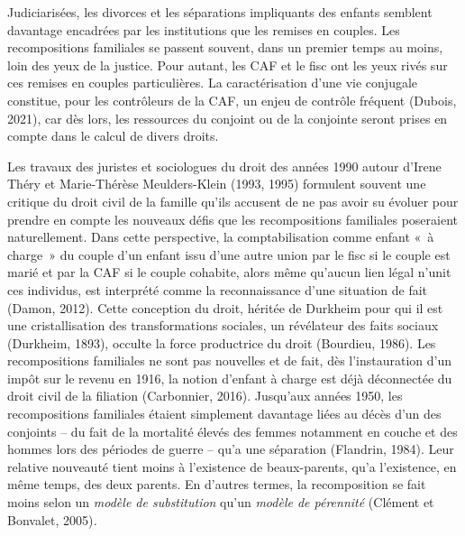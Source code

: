 \documentclass[
  12pt,
]{book}
\begin{document}
Judiciarisées, les divorces et les séparations impliquants des enfants
semblent davantage encadrées par les institutions que les remises en
couples. Les recompositions familiales se passent souvent, dans un
premier temps au moins, loin des yeux de la justice. Pour autant, les
CAF et le fisc ont les yeux rivés sur ces remises en couples
particulières. La caractérisation d'une vie conjugale constitue, pour
les contrôleurs de la CAF, un enjeu de contrôle fréquent (Dubois, 2021),
car dès lors, les ressources du conjoint ou de la conjointe seront
prises en compte dans le calcul de divers droits.

Les travaux des juristes et sociologues du droit des années 1990 autour
d'Irene Théry et Marie-Thérèse Meulders-Klein (1993, 1995) formulent
souvent une critique du droit civil de la famille qu'ils accusent de ne
pas avoir su évoluer pour prendre en compte les nouveaux défis que les
recompositions familiales poseraient naturellement. Dans cette
perspective, la comptabilisation comme enfant «~à charge~» du couple
d'un enfant issu d'une autre union par le fisc si le couple est marié et
par la CAF si le couple cohabite, alors même qu'aucun lien légal n'unit
ces individus, est interprété comme la reconnaissance d'une situation de
fait (Damon, 2012). Cette conception du droit, héritée de Durkheim pour
qui il est une cristallisation des transformations sociales, un
révélateur des faits sociaux (Durkheim, 1893), occulte la force
productrice du droit (Bourdieu, 1986). Les recompositions familiales ne
sont pas nouvelles et de fait, dès l'instauration d'un impôt sur le
revenu en 1916, la notion d'enfant à charge est déjà déconnectée du
droit civil de la filiation (Carbonnier, 2016). Jusqu'aux années 1950,
les recompositions familiales étaient simplement davantage liées au
décès d'un des conjoints -- du fait de la mortalité élevés des femmes
notamment en couche et des hommes lors des périodes de guerre -- qu'a
une séparation (Flandrin, 1984). Leur relative nouveauté tient moins à
l'existence de beaux-parents, qu'a l'existence, en même temps, des deux
parents. En d'autres termes, la recomposition se fait moins selon un
\emph{modèle de substitution} qu'un \emph{modèle de pérennité} (Clément
et Bonvalet, 2005)\emph{.}
\end{document}
